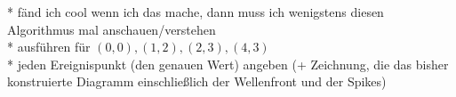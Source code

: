 * fänd ich cool wenn ich das mache, dann muss ich wenigstens diesen Algorithmus mal anschauen/verstehen\\
* ausführen für ${(0, 0), (1, 2), (2, 3), (4, 3)}$\\
* jeden Ereignispunkt (den genauen Wert) angeben (+ Zeichnung, die das
bisher konstruierte Diagramm einschließlich der Wellenfront und der Spikes)\\